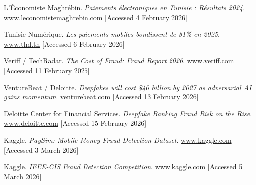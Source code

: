 \documentclass[12pt,a4paper]{report}
\begin{document}
\begin{enumerate}[label={[W\arabic*]},leftmargin=1.6cm,itemsep=1.5pt,parsep=0pt,topsep=2pt]

  \item {}\label{web:bct1}
        L'Économiste Maghrébin. \textit{Paiements électroniques en Tunisie : Résultats 2024}.
        \href{https://www.leconomistemaghrebin.com/2025/02/25/paiements-electroniques-tunisie/}%
        {www.leconomistemaghrebin.com} [Accessed 4 February 2026]

  \item {}\label{web:bct2}
        Tunisie Numérique. \textit{Les paiements mobiles bondissent de 81\% en 2025}.
        \href{https://www.thd.tn/paiement-mobile-en-tunisie-81-de-transactions-en-2025/}%
        {www.thd.tn} [Accessed 6 February 2026]

  \item {}\label{web:veriff}
        Veriff / TechRadar. \textit{The Cost of Fraud: Fraud Report 2026}.
        \href{https://www.veriff.com/fraud/learn/the-cost-of-fraud}{www.veriff.com}
        [Accessed 11 February 2026]

  \item {}\label{web:deepfake}
        VentureBeat / Deloitte. \textit{Deepfakes will cost \$40 billion by 2027 as
        adversarial AI gains momentum}.
        \href{https://venturebeat.com/security/deepfakes-will-cost-40-billion-by-2027-as-adversarial-ai-gains-momentum}%
        {venturebeat.com} [Accessed 13 February 2026]

  \item {}\label{web:deloitte}
        Deloitte Center for Financial Services. \textit{Deepfake Banking Fraud Risk on the
        Rise}.
        \href{https://www.deloitte.com/us/en/insights/industry/financial-services/deepfake-banking-fraud-risk-on-the-rise.html}%
        {www.deloitte.com} [Accessed 15 February 2026]

  \item {}\label{web:paysim}
        Kaggle. \textit{PaySim: Mobile Money Fraud Detection Dataset}.
        \href{https://www.kaggle.com/datasets/ealaxi/paysim1}{www.kaggle.com}
        [Accessed 3 March 2026]

  \item {}\label{web:ieeecis}
        Kaggle. \textit{IEEE-CIS Fraud Detection Competition}.
        \href{https://www.kaggle.com/competitions/ieee-fraud-detection}{www.kaggle.com}
        [Accessed 5 March 2026]


\end{enumerate}
\end{document}
